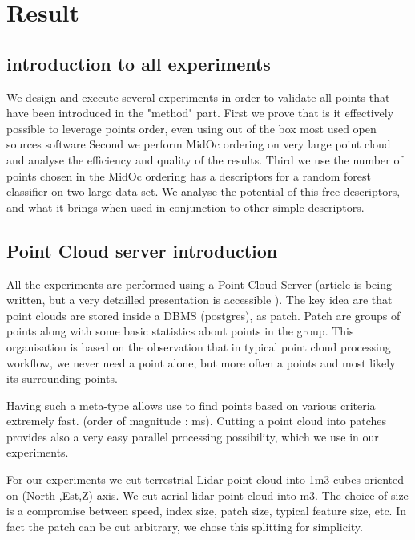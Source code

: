 

 \section{Result}
 	\subsection{introduction to all experiments}
 		We design and execute several experiments in order to validate all points that have been introduced in the "method" part.
 		First we prove that is it effectively possible to leverage points order, even using out of the box most used open sources software
 		Second we perform MidOc ordering on very large point cloud and analyse the efficiency and quality of the results.
 		Third we use the number of points chosen in the MidOc ordering has a descriptors for a random forest classifier on two large data set.
 		We analyse the potential of this free descriptors, and what it brings when used in conjunction to other simple descriptors.
	\subsection{Point Cloud server introduction}
		All the experiments are performed using a Point Cloud Server (article is being written, but a very detailled presentation is accessible ).
		The key idea are that point clouds are stored inside a DBMS (postgres), as patch. Patch are groups of points along with some basic statistics about points in the group.
		This organisation is based on the observation that in typical point cloud processing workflow, we never need a point alone, but more often a points and most likely its surrounding points.
		
		Having such a meta-type allows use to find points based on various criteria extremely fast. (order of magnitude : ms). 
		Cutting a point cloud into patches provides also a very easy parallel processing possibility, which we use in our experiments.
		
		For our experiments we cut terrestrial Lidar point cloud into 1m3 cubes oriented on (North ,Est,Z) axis.
		We cut aerial lidar point cloud into  m3.
		The choice of size is a compromise between speed, index size, patch size, typical feature size, etc.
		In fact the patch can be cut arbitrary, we chose this splitting for simplicity.
